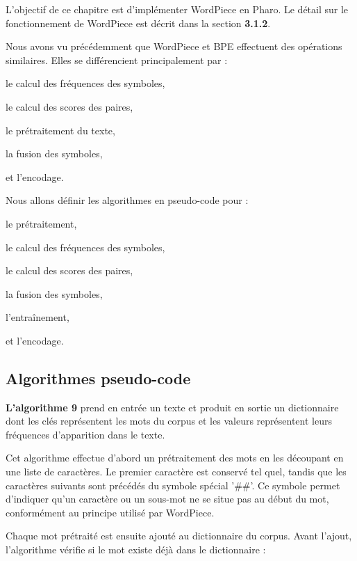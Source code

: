 \documentclass[12pt,a4paper]{report}
\begin{document}
	L'objectif de ce chapitre est d'implémenter WordPiece en Pharo. Le détail sur le fonctionnement de WordPiece est décrit dans la section \textbf{3.1.2}.
	
	Nous avons vu précédemment que WordPiece et BPE effectuent des opérations similaires. 
	Elles se différencient principalement par :
	
	\begin{itemizeFB}
		\item le calcul des fréquences des symboles,
		\item le calcul des scores des paires,
		\item le prétraitement du texte,
		\item la fusion des symboles,
		\item et l’encodage.
	\end{itemizeFB}
	
	Nous allons définir les algorithmes en pseudo-code pour :
	
	\begin{itemizeFB}
		\item le prétraitement,
		\item le calcul des fréquences des symboles,
		\item le calcul des scores des paires,
		\item la fusion des symboles,
		\item l’entraînement,
		\item et l’encodage.
	\end{itemizeFB}
	
	\subsection{Algorithmes pseudo-code}
	
	\textbf{L’algorithme 9} prend en entrée un texte et produit en sortie un dictionnaire dont les clés représentent les mots du corpus et les valeurs représentent leurs fréquences d’apparition dans le texte.
	
	Cet algorithme effectue d’abord un prétraitement des mots en les découpant en une liste de caractères. Le premier caractère est conservé tel quel, tandis que les caractères suivants sont précédés du symbole spécial '\#\#'. Ce symbole permet d’indiquer qu’un caractère ou un sous-mot ne se situe pas au début du mot, conformément au principe utilisé par WordPiece.
	
	Chaque mot prétraité est ensuite ajouté au dictionnaire du corpus. Avant l’ajout, l’algorithme vérifie si le mot existe déjà dans le dictionnaire :
	
\end{document}
